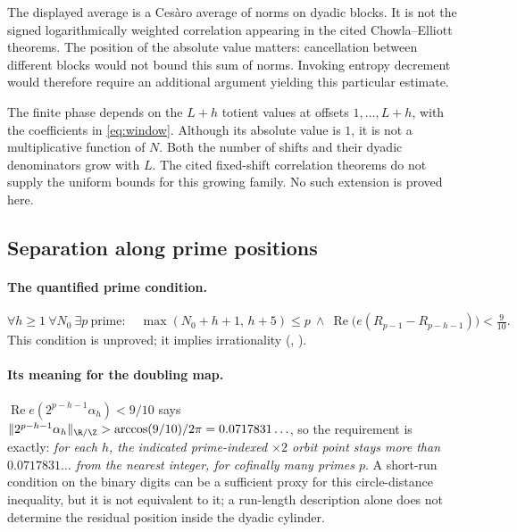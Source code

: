 The displayed average is a Ces\`aro average of norms on dyadic blocks.
It is not the signed logarithmically weighted correlation appearing in
the cited Chowla--Elliott theorems. The position of the absolute value
matters: cancellation between different blocks would not bound this
sum of norms. Invoking entropy decrement would therefore require an
additional argument yielding this particular estimate.

The finite phase depends on the $L+h$ totient values at offsets
$1,\ldots,L+h$, with the coefficients in \eqref{eq:window}.
Although its absolute value is $1$, it is not a multiplicative function
of $N$. Both the number of shifts and their dyadic denominators grow with
$L$. The cited fixed-shift correlation theorems do not supply the uniform
bounds for this growing family. No such extension is proved here.

\subsection{Separation along prime positions}

\paragraph{The quantified prime condition.}
\[
  \forall h\ge 1\ \forall N_0\ \exists p\ \text{prime}:\quad
  \max(N_0+h+1,\,h+5)\le p
  \ \wedge\
  \operatorname{Re}\bigl(e(R_{p-1}-R_{p-h-1})\bigr)<\tfrac{9}{10}.
\]
This condition is unproved; it implies irrationality
(,
).

\paragraph{Its meaning for the doubling map.}
$\operatorname{Re}e(2^{p-h-1}\alpha_h)<9/10$ says
$\|2^{p-h-1}\alpha_h\|_{\R/\Z}>\arccos(9/10)/2\pi=0.0717831\ldots$, so the
requirement is exactly: \emph{for each $h$, the indicated prime-indexed
$\times2$ orbit point stays more than $0.0717831\ldots$ from the nearest
integer, for cofinally many primes $p$}.  A short-run condition on the binary
digits can be a sufficient proxy for this circle-distance inequality, but it
is not equivalent to it; a run-length description alone does not determine
the residual position inside the dyadic cylinder.

